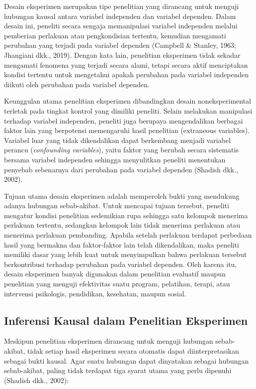 \documentclass[
  indonesian,
  letterpaper,
  DIV=11,
  numbers=noendperiod]{scrreprt}
\begin{document}
Desain eksperimen merupakan tipe penelitian yang dirancang untuk menguji
hubungan kausal antara variabel independen dan variabel dependen. Dalam
desain ini, peneliti secara sengaja memanipulasi variabel independen
melalui pemberian perlakuan atau pengkondisian tertentu, kemudian
mengamati perubahan yang terjadi pada variabel dependen (Campbell \&
Stanley, 1963; Jhangiani dkk., 2019). Dengan kata lain, penelitian
eksperimen tidak sekadar mengamati fenomena yang terjadi secara alami,
tetapi secara aktif menciptakan kondisi tertentu untuk mengetahui apakah
perubahan pada variabel independen diikuti oleh perubahan pada variabel
dependen.

Keunggulan utama penelitian eksperimen dibandingkan desain
noneksperimental terletak pada tingkat kontrol yang dimiliki peneliti.
Selain melakukan manipulasi terhadap variabel independen, peneliti juga
berupaya mengendalikan berbagai faktor lain yang berpotensi memengaruhi
hasil penelitian (extraneous variables). Variabel luar yang tidak
dikendalikan dapat berkembang menjadi variabel perancu
(\emph{confounding variables}), yaitu faktor yang berubah secara
sistematis bersama variabel independen sehingga menyulitkan peneliti
menentukan penyebab sebenarnya dari perubahan pada variabel dependen
(Shadish dkk., 2002).

Tujuan utama desain eksperimen adalah memperoleh bukti yang mendukung
adanya hubungan sebab-akibat. Untuk mencapai tujuan tersebut, peneliti
mengatur kondisi penelitian sedemikian rupa sehingga satu kelompok
menerima perlakuan tertentu, sedangkan kelompok lain tidak menerima
perlakuan atau menerima perlakuan pembanding. Apabila setelah perlakuan
terdapat perbedaan hasil yang bermakna dan faktor-faktor lain telah
dikendalikan, maka peneliti memiliki dasar yang lebih kuat untuk
menyimpulkan bahwa perlakuan tersebut berkontribusi terhadap perubahan
pada variabel dependen. Oleh karena itu, desain eksperimen banyak
digunakan dalam penelitian evaluatif maupun penelitian yang menguji
efektivitas suatu program, pelatihan, terapi, atau intervensi
psikologis, pendidikan, kesehatan, maupun sosial.

\subsection{Inferensi Kausal dalam Penelitian
Eksperimen}\label{inferensi-kausal-dalam-penelitian-eksperimen}

Meskipun penelitian eksperimen dirancang untuk menguji hubungan
sebab-akibat, tidak setiap hasil eksperimen secara otomatis dapat
diinterpretasikan sebagai bukti kausal. Agar suatu hubungan dapat
dinyatakan sebagai hubungan sebab-akibat, paling tidak terdapat tiga
syarat utama yang perlu dipenuhi (Shadish dkk., 2002):
\end{document}
